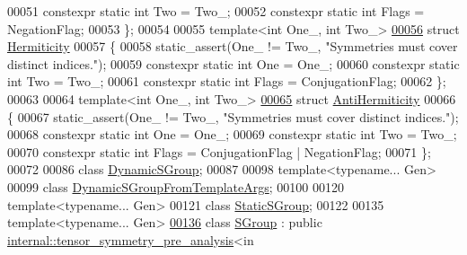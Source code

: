 \begin{DoxyCode}
00051   constexpr \textcolor{keyword}{static} \textcolor{keywordtype}{int} Two = Two\_;
00052   constexpr \textcolor{keyword}{static} \textcolor{keywordtype}{int} Flags = NegationFlag;
00053 \};
00054 
00055 \textcolor{keyword}{template}<\textcolor{keywordtype}{int} One\_, \textcolor{keywordtype}{int} Two\_>
\hyperlink{struct_eigen_1_1_hermiticity}{00056} \textcolor{keyword}{struct }\hyperlink{struct_eigen_1_1_hermiticity}{Hermiticity}
00057 \{
00058   static\_assert(One\_ != Two\_, \textcolor{stringliteral}{"Symmetries must cover distinct indices."});
00059   constexpr \textcolor{keyword}{static} \textcolor{keywordtype}{int} One = One\_;
00060   constexpr \textcolor{keyword}{static} \textcolor{keywordtype}{int} Two = Two\_;
00061   constexpr \textcolor{keyword}{static} \textcolor{keywordtype}{int} Flags = ConjugationFlag;
00062 \};
00063 
00064 \textcolor{keyword}{template}<\textcolor{keywordtype}{int} One\_, \textcolor{keywordtype}{int} Two\_>
\hyperlink{struct_eigen_1_1_anti_hermiticity}{00065} \textcolor{keyword}{struct }\hyperlink{struct_eigen_1_1_anti_hermiticity}{AntiHermiticity}
00066 \{
00067   static\_assert(One\_ != Two\_, \textcolor{stringliteral}{"Symmetries must cover distinct indices."});
00068   constexpr \textcolor{keyword}{static} \textcolor{keywordtype}{int} One = One\_;
00069   constexpr \textcolor{keyword}{static} \textcolor{keywordtype}{int} Two = Two\_;
00070   constexpr \textcolor{keyword}{static} \textcolor{keywordtype}{int} Flags = ConjugationFlag | NegationFlag;
00071 \};
00072 
00086 \textcolor{keyword}{class }\hyperlink{class_eigen_1_1_dynamic_s_group}{DynamicSGroup};
00087 
00098 \textcolor{keyword}{template}<\textcolor{keyword}{typename}... Gen>
00099 \textcolor{keyword}{class }\hyperlink{class_eigen_1_1_dynamic_s_group_from_template_args}{DynamicSGroupFromTemplateArgs};
00100 
00120 \textcolor{keyword}{template}<\textcolor{keyword}{typename}... Gen>
00121 \textcolor{keyword}{class }\hyperlink{class_eigen_1_1_static_s_group}{StaticSGroup};
00122 
00135 \textcolor{keyword}{template}<\textcolor{keyword}{typename}... Gen>
\hyperlink{class_eigen_1_1_s_group}{00136} \textcolor{keyword}{class }\hyperlink{class_eigen_1_1_s_group}{SGroup} : \textcolor{keyword}{public} \hyperlink{struct_eigen_1_1internal_1_1tensor__symmetry__pre__analysis}{internal::tensor\_symmetry\_pre\_analysis}<in

\end{DoxyCode}
